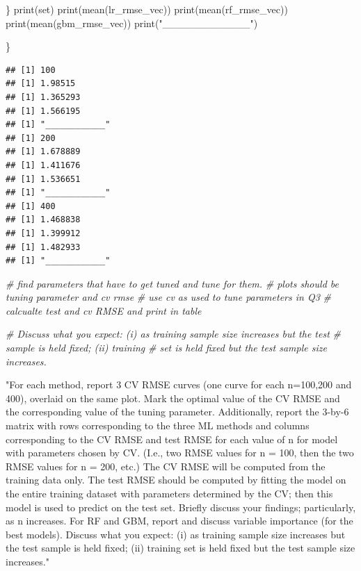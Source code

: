 \documentclass[
  11pt,
]{article}
\newenvironment{Shaded}{\begin{snugshade}}{\end{snugshade}}
\newcommand{\CommentTok}[1]{\textcolor[rgb]{0.56,0.35,0.01}{\textit{#1}}}
\newcommand{\FunctionTok}[1]{\textcolor[rgb]{0.00,0.00,0.00}{#1}}
\newcommand{\NormalTok}[1]{#1}
\newcommand{\StringTok}[1]{\textcolor[rgb]{0.31,0.60,0.02}{#1}}
\begin{document}
\begin{Shaded}
\begin{Highlighting}[]
\NormalTok{  \}}
  \FunctionTok{print}\NormalTok{(set)}
  \FunctionTok{print}\NormalTok{(}\FunctionTok{mean}\NormalTok{(lr\_rmse\_vec))}
  \FunctionTok{print}\NormalTok{(}\FunctionTok{mean}\NormalTok{(rf\_rmse\_vec))}
  \FunctionTok{print}\NormalTok{(}\FunctionTok{mean}\NormalTok{(gbm\_rmse\_vec))}
  \FunctionTok{print}\NormalTok{(}\StringTok{"\_\_\_\_\_\_\_\_\_\_\_\_"}\NormalTok{)}
  
  
  
\NormalTok{\}}
\end{Highlighting}
\end{Shaded}

\begin{verbatim}
## [1] 100
## [1] 1.98515
## [1] 1.365293
## [1] 1.566195
## [1] "____________"
## [1] 200
## [1] 1.678889
## [1] 1.411676
## [1] 1.536651
## [1] "____________"
## [1] 400
## [1] 1.468838
## [1] 1.399912
## [1] 1.482933
## [1] "____________"
\end{verbatim}

\begin{Shaded}
\begin{Highlighting}[]
\CommentTok{\# find parameters that have to get tuned and tune for them. }
\CommentTok{\# plots should be tuning parameter and cv rmse}
\CommentTok{\# use cv as used to tune parameters in Q3}
\CommentTok{\# calcualte test and cv RMSE and print in table }

\CommentTok{\# Discuss what you expect: (i) as training sample size increases but the test  }
\CommentTok{\# sample is held fixed; (ii) training}
\CommentTok{\# set is held fixed but the test sample size increases.}


\StringTok{"For each method, report 3 CV RMSE curves (one curve for each n=100,200 and 400), overlaid on the}
\StringTok{same plot. Mark the optimal value of the CV RMSE and the corresponding value of the tuning parameter.}
\StringTok{Additionally, report the 3{-}by{-}6 matrix with rows corresponding to the three ML methods and columns}
\StringTok{corresponding to the CV RMSE and test RMSE for each value of n for model with parameters chosen by}
\StringTok{CV. (I.e., two RMSE values for n = 100, then the two RMSE values for n = 200, etc.) The CV RMSE}
\StringTok{will be computed from the training data only. The test RMSE should be computed by fitting the model}
\StringTok{on the entire training dataset with parameters determined by the CV; then this model is used to predict}
\StringTok{on the test set.}
\StringTok{Briefly discuss your findings; particularly, as n increases.}
\StringTok{For RF and GBM, report and discuss variable importance (for the best models).}
\StringTok{Discuss what you expect: (i) as training sample size increases but the test sample is held fixed; (ii) training}
\StringTok{set is held fixed but the test sample size increases."}
\end{Highlighting}
\end{Shaded}
\end{document}
